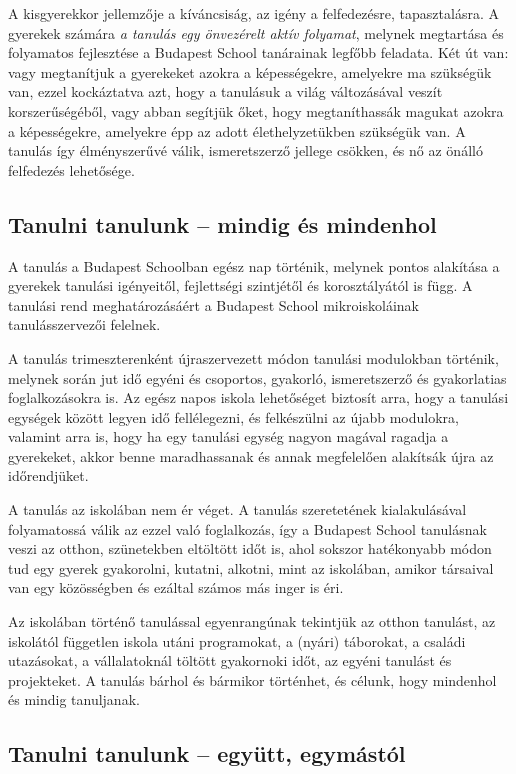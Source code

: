 A kisgyerekkor jellemzője a kíváncsiság, az igény a felfedezésre, tapasztalásra. A gyerekek számára  \emph{a tanulás  egy önvezérelt aktív folyamat}, melynek megtartása és folyamatos fejlesztése a Budapest School tanárainak legfőbb feladata. Két út van: vagy megtanítjuk a gyerekeket azokra a képességekre, amelyekre ma szükségük van, ezzel kockáztatva azt, hogy a tanulásuk a világ változásával veszít korszerűségéből, vagy abban segítjük őket, hogy megtaníthassák magukat azokra a képességekre, amelyekre épp az adott élethelyzetükben szükségük van. A tanulás így élményszerűvé válik, ismeretszerző jellege csökken, és nő az önálló felfedezés lehetősége.

\subsection{Tanulni tanulunk -- mindig és mindenhol}
A tanulás a Budapest Schoolban egész nap történik, melynek pontos alakítása a gyerekek tanulási igényeitől, fejlettségi szintjétől és korosztályától is függ. A tanulási rend meghatározásáért a Budapest School mikroiskoláinak tanulásszervezői felelnek.

A tanulás trimeszterenként újraszervezett módon tanulási modulokban történik, melynek során jut idő egyéni és csoportos, gyakorló, ismeretszerző és gyakorlatias foglalkozásokra is. Az egész napos iskola lehetőséget biztosít arra, hogy a tanulási egységek között legyen idő fellélegezni, és felkészülni az újabb modulokra, valamint arra is, hogy ha egy tanulási egység nagyon magával ragadja a gyerekeket, akkor benne maradhassanak és annak megfelelően alakítsák újra az időrendjüket.

A tanulás az iskolában nem ér véget. A tanulás szeretetének kialakulásával folyamatossá válik az ezzel való foglalkozás, így a Budapest School tanulásnak veszi az otthon, szünetekben eltöltött időt is, ahol sokszor hatékonyabb módon tud egy gyerek gyakorolni, kutatni, alkotni, mint az iskolában, amikor társaival van egy közösségben és ezáltal számos más inger is éri.

Az iskolában történő tanulással egyenrangúnak tekintjük az otthon tanulást, az iskolától független iskola utáni programokat, a (nyári) táborokat, a családi utazásokat, a vállalatoknál töltött gyakornoki időt, az egyéni tanulást és projekteket. A tanulás bárhol és bármikor történhet, és célunk, hogy mindenhol és mindig tanuljanak.

\subsection{Tanulni tanulunk -- együtt, egymástól}

